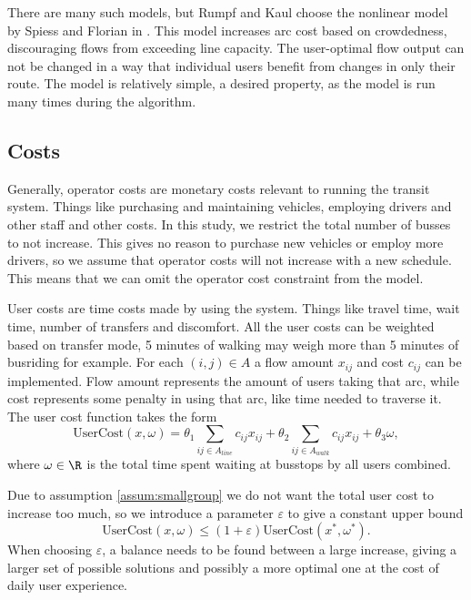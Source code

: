 There are many such models, but Rumpf and Kaul choose the nonlinear model by Spiess and Florian in \cite{spiess}. This model increases arc cost based on crowdedness, discouraging flows from exceeding line capacity. The user-optimal flow output can not be changed in a way that individual users benefit from changes in only their route. The model is relatively simple, a desired property, as the model is run many times during the algorithm.

\subsection{Costs}\label{sec:costs}
Generally, operator costs are monetary costs relevant to running the transit system. Things like purchasing and maintaining vehicles, employing drivers and other staff and other costs. In this study, we restrict the total number of busses to not increase. This gives no reason to purchase new vehicles or employ more drivers, so we assume that operator costs will not increase with a new schedule. This means that we can omit the operator cost constraint from the model.

User costs are time costs made by using the system. Things like travel time, wait time, number of transfers and discomfort. All the user costs can be weighted based on transfer mode, 5 minutes of walking may weigh more than 5 minutes of busriding for example. For each $(i,j)\in A$ a flow amount $x_{ij}$ and cost $c_{ij}$ can be implemented. Flow amount represents the amount of users taking that arc, while cost represents some penalty in using that arc, like time needed to traverse it. The user cost function takes the form
\begin{equation*}
    \text{UserCost}(x, \omega) = \theta_1 \sum_{ij\in A_{line}} c_{ij}x_{ij}
    +\theta_2 \sum_{ij\in A_{walk}} c_{ij}x_{ij}
    +\theta_3 \omega,
\end{equation*}
where $\omega\in \R$ is the total time spent waiting at busstops by all users combined.

Due to assumption \ref{assum:smallgroup} we do not want the total user cost to increase too much, so we introduce a parameter $\varepsilon$ to give a constant upper bound
\begin{equation*}
    \text{UserCost}(x, \omega) \leq (1+\varepsilon)\text{UserCost}(x^*, \omega^*).
\end{equation*}
When choosing $\varepsilon$, a balance needs to be found between a large increase, giving a larger set of possible solutions and possibly a more optimal one at the cost of daily user experience.

